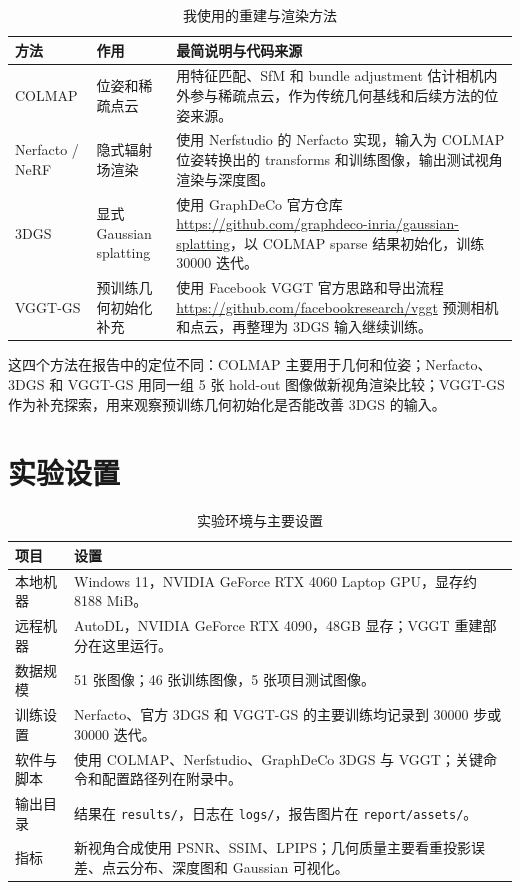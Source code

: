 \documentclass[UTF8,a4paper,11pt]{ctexart}
\begin{document}
\begin{table}[H]
  \centering
  \caption{我使用的重建与渲染方法}
  \label{tab:methods}
  \footnotesize
  \begin{tabular}{p{2.6cm}p{4.1cm}p{7.5cm}}
    \toprule
    方法 & 作用 & 最简说明与代码来源 \\
    \midrule
    COLMAP & 位姿和稀疏点云 & 用特征匹配、SfM 和 bundle adjustment 估计相机内外参与稀疏点云，作为传统几何基线和后续方法的位姿来源。\\
    Nerfacto / NeRF & 隐式辐射场渲染 & 使用 Nerfstudio 的 Nerfacto 实现，输入为 COLMAP 位姿转换出的 transforms 和训练图像，输出测试视角渲染与深度图。\\
    3DGS & 显式 Gaussian splatting & 使用 GraphDeCo 官方仓库 \url{https://github.com/graphdeco-inria/gaussian-splatting}，以 COLMAP sparse 结果初始化，训练 30000 迭代。\\
    VGGT-GS & 预训练几何初始化补充 & 使用 Facebook VGGT 官方思路和导出流程 \url{https://github.com/facebookresearch/vggt} 预测相机和点云，再整理为 3DGS 输入继续训练。\\
    \bottomrule
  \end{tabular}
\end{table}

这四个方法在报告中的定位不同：COLMAP 主要用于几何和位姿；Nerfacto、3DGS 和 VGGT-GS 用同一组 5 张 hold-out 图像做新视角渲染比较；VGGT-GS 作为补充探索，用来观察预训练几何初始化是否能改善 3DGS 的输入。

\section{实验设置}

\begin{table}[H]
  \centering
  \caption{实验环境与主要设置}
  \label{tab:settings}
  \footnotesize
  \begin{tabular}{p{3.1cm}p{11.1cm}}
    \toprule
    项目 & 设置 \\
    \midrule
    本地机器 & Windows 11，NVIDIA GeForce RTX 4060 Laptop GPU，显存约 8188 MiB。\\
    远程机器 & AutoDL，NVIDIA GeForce RTX 4090，48GB 显存；VGGT 重建部分在这里运行。\\
    数据规模 & 51 张图像；46 张训练图像，5 张项目测试图像。\\
    训练设置 & Nerfacto、官方 3DGS 和 VGGT-GS 的主要训练均记录到 30000 步或 30000 迭代。\\
    软件与脚本 & 使用 COLMAP、Nerfstudio、GraphDeCo 3DGS 与 VGGT；关键命令和配置路径列在附录中。\\
    输出目录 & 结果在 \texttt{results/}，日志在 \texttt{logs/}，报告图片在 \texttt{report/assets/}。\\
    指标 & 新视角合成使用 PSNR、SSIM、LPIPS；几何质量主要看重投影误差、点云分布、深度图和 Gaussian 可视化。\\
    \bottomrule
  \end{tabular}
\end{table}
\end{document}
